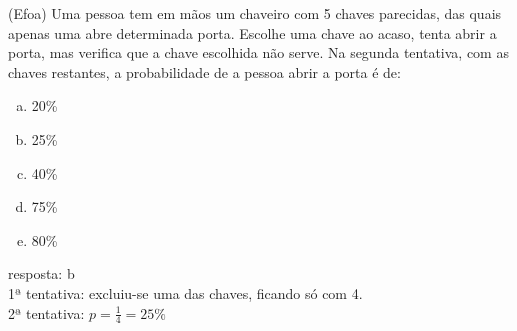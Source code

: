 \begin{ex}
(Efoa) Uma pessoa tem em mãos um chaveiro com 5 chaves parecidas, das quais apenas uma abre determinada porta. Escolhe uma chave ao acaso, tenta abrir a porta, mas verifica que a chave escolhida não serve. Na segunda tentativa, com as chaves restantes, a probabilidade de a pessoa abrir a porta é de:
   \begin{enumerate}[(a)]
   \item 20\%
   \item 25\%
   \item 40\%
   \item 75\%
   \item 80\%
   \end{enumerate}
     \begin{sol}
      resposta: b \\
       1ª tentativa:  excluiu-se uma das chaves, ficando só com 4.\\
       2ª tentativa: $p=\frac{1}{4}=25\%$
     \end{sol}
\end{ex}